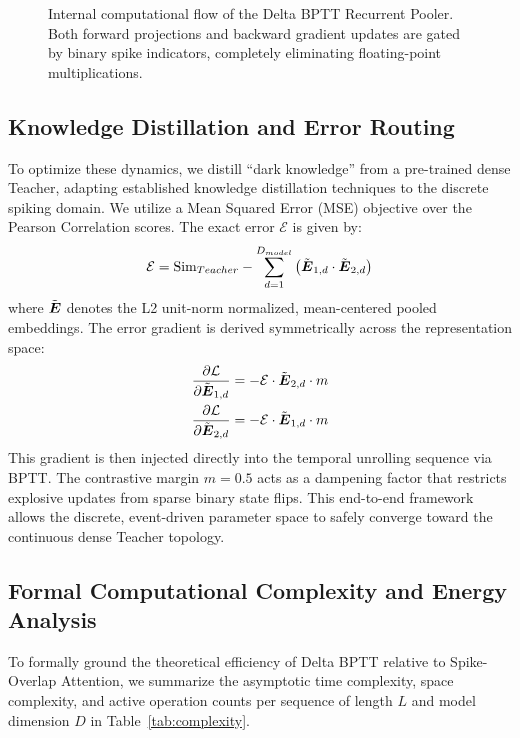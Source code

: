 \documentclass[runningheads]{llncs}
\begin{document}
\begin{figure}[t]
{%
}
\caption{Internal computational flow of the Delta BPTT Recurrent Pooler. Both forward projections and backward gradient updates are gated by binary spike indicators, completely eliminating floating-point multiplications.}
\label{fig:pooler_mech}
\end{figure}

\subsection{Knowledge Distillation and Error Routing}
To optimize these dynamics, we distill ``dark knowledge'' from a pre-trained dense Teacher, adapting established knowledge distillation techniques \cite{hinton2015distilling} to the discrete spiking domain. We utilize a Mean Squared Error (MSE) objective over the Pearson Correlation scores. The exact error $\mathcal{E}$ is given by:
\begin{equation}
\mathcal{E} = \text{Sim}_{Teacher} - \sum_{d=1}^{D_{model}} \left(\tilde{\boldsymbol{E}}_{1,d} \cdot \tilde{\boldsymbol{E}}_{2,d}\right)
\end{equation}
where $\tilde{\boldsymbol{E}}$ denotes the L2 unit-norm normalized, mean-centered pooled embeddings. The error gradient is derived symmetrically across the representation space:
\begin{align}
\frac{\partial \mathcal{L}}{\partial \tilde{\boldsymbol{E}}_{1,d}} &= -\mathcal{E} \cdot \tilde{\boldsymbol{E}}_{2,d} \cdot m \\
\frac{\partial \mathcal{L}}{\partial \tilde{\boldsymbol{E}}_{2,d}} &= -\mathcal{E} \cdot \tilde{\boldsymbol{E}}_{1,d} \cdot m
\end{align}
This gradient is then injected directly into the temporal unrolling sequence via BPTT. The contrastive margin $m=0.5$ acts as a dampening factor that restricts explosive updates from sparse binary state flips. This end-to-end framework allows the discrete, event-driven parameter space to safely converge toward the continuous dense Teacher topology.

\subsection{Formal Computational Complexity and Energy Analysis}
To formally ground the theoretical efficiency of Delta BPTT relative to Spike-Overlap Attention, we summarize the asymptotic time complexity, space complexity, and active operation counts per sequence of length $L$ and model dimension $D$ in Table~\ref{tab:complexity}.
\end{document}
